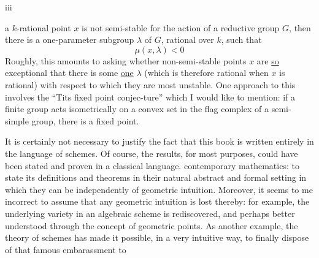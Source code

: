 \begin{center}iii\end{center}

a $k$-rational point $x$ is not semi-stable for the action of a reductive group $G$, then there is a one-parameter subgroup $\lambda$ of $G$, rational over $k$, such that
\[
\mu(x,\lambda)<0
\]
Roughly, this amounts to asking whether non-semi-stable points $x$ are \uline{so} exceptional that there is some \uline{one} $\lambda$ (which is therefore rational when $x$ is rational) with respect to which they are most unstable. One approach to this involves the ``Tits fixed point conjec-ture'' which I would like to mention: if a finite group acts isometrically on a convex set in the flag complex of a semi-simple group, there is a fixed point.

It is certainly not necessary to justify the fact that this book is written entirely in the language of schemes. Of course, the results, for most purposes, could have been stated and proven in a classical language.
contemporary mathematics: to state its definitions and theorems in their natural abstract and formal setting in which they can be   independently of geometric intuition. Moreover, it seems to me incorrect to assume that any geometric intuition is lost thereby: for example, the underlying variety in an algebraic scheme is rediscovered, and perhaps better understood through the concept of geometric points. As another example, the theory of schemes has made it possible, in a very intuitive way, to finally dispose of that famous embarassment to

